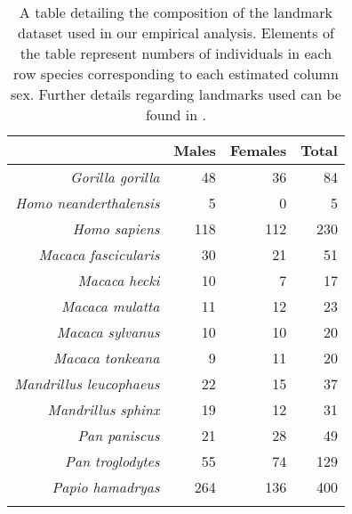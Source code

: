 \begin{longtable}{rrrr}
  \hline
 & Males & Females & Total \\ 
  \hline
\textit{Gorilla gorilla} &  48 &  36 &  84 \\ 
  \textit{Homo neanderthalensis} &   5 &   0 &   5 \\ 
  \textit{Homo sapiens} & 118 & 112 & 230 \\ 
  \textit{Macaca fascicularis} &  30 &  21 &  51 \\ 
  \textit{Macaca hecki} &  10 &   7 &  17 \\ 
  \textit{Macaca mulatta} &  11 &  12 &  23 \\ 
  \textit{Macaca sylvanus} &  10 &  10 &  20 \\ 
  \textit{Macaca tonkeana} &   9 &  11 &  20 \\ 
  \textit{Mandrillus leucophaeus} &  22 &  15 &  37 \\ 
  \textit{Mandrillus sphinx} &  19 &  12 &  31 \\ 
  \textit{Pan paniscus} &  21 &  28 &  49 \\ 
  \textit{Pan troglodytes} &  55 &  74 & 129 \\ 
  \textit{Papio hamadryas} & 264 & 136 & 400 \\ 
   \hline
\hline
\caption[Composition of Landmark Data Used in Empirical Analysis]{A table detailing the composition of the landmark dataset used in 
                                            our empirical analysis. Elements of the table represent numbers of individuals in each 
                                            row species corresponding to each 
                                            estimated column sex. Further details regarding landmarks used can be found in \citep{harvatiNeanderthalTaxonomyReconsidered2004}.} 
\label{tab:landmarkDataComposition}
\end{longtable}
